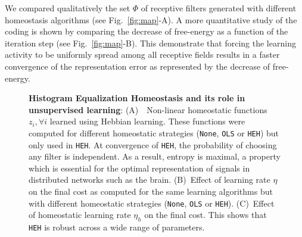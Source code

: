 \documentclass[a4paper, 11pt, draft]{article} %
\newcommand{\dico}{\Phi} %
\begin{document}
We compared qualitatively the set $\dico$ of receptive filters generated with different homeostasis algorithms (see Fig.~\ref{fig:map}-A). A more quantitative study of the coding is shown by comparing the decrease of free-energy as a function of the iteration step (see Fig.~\ref{fig:map}-B). This demonstrate that forcing the learning activity to be uniformly spread among all receptive fields results in a faster convergence of the representation error as represented by the decrease of free-energy.
\begin{figure}[!ht]%
\caption{
{\bf Histogram Equalization Homeostasis and its role in unsupervised learning}:
{\sf (A)}~~Non-linear homeostatic functions $z_i, \forall i$ learned using Hebbian learning. These functions were computed for different homeostatic strategies (\texttt{None}, \texttt{OLS} or \texttt{HEH}) but only used in \texttt{HEH}. At convergence of \texttt{HEH}, the probability of choosing any filter is independent. As a result, entropy is maximal, a property which is essential for the optimal representation of signals in distributed networks such as the brain.
{\sf (B)}~Effect of learning rate $\eta$ on the final cost as computed for the same learning algorithms but with different homeostatic strategies (\texttt{None}, \texttt{OLS} or \texttt{HEH}).
{\sf (C)}~Effect of homeostatic learning rate $\eta_h$ on the final cost. This shows that \texttt{HEH} is robust across a wide range of parameters.
}
\end{figure}
\end{document}

